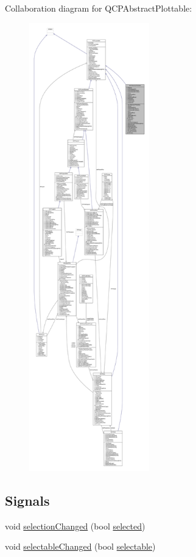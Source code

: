 Collaboration diagram for Q\+C\+P\+Abstract\+Plottable\+:\nopagebreak
\begin{figure}[H]
\begin{center}
\leavevmode
\includegraphics[height=550pt]{class_q_c_p_abstract_plottable__coll__graph}
\end{center}
\end{figure}
\subsection*{Signals}
\begin{DoxyCompactItemize}
\item 
void \hyperlink{class_q_c_p_abstract_plottable_a3af66432b1dca93b28e00e78a8c7c1d9}{selection\+Changed} (bool \hyperlink{class_q_c_p_abstract_plottable_ab901903adcb0e29467d63de72340ab29}{selected})
\item 
void \hyperlink{class_q_c_p_abstract_plottable_a0059caa3f3581f3959660fef8cbb71c4}{selectable\+Changed} (bool \hyperlink{class_q_c_p_abstract_plottable_af895574da1ec0d050711b6c9deda296a}{selectable})
\end{DoxyCompactItemize}
